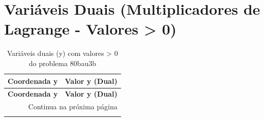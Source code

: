 \documentclass[12pt]{article}
\begin{document}
\section{Variáveis Duais (Multiplicadores de Lagrange - Valores > 0)}

\begin{longtable}{@{}cc@{}}
\caption{Variáveis duais (y) com valores > 0 do problema 80bau3b} \\
\toprule
\textbf{Coordenada y} & \textbf{Valor y (Dual)} \\
\midrule
\endfirsthead

\toprule
\textbf{Coordenada y} & \textbf{Valor y (Dual)} \\
\midrule
\endhead

\midrule \multicolumn{2}{r}{{Continua na próxima página}} \\ \midrule
\endfoot


\end{longtable}
\end{document}
